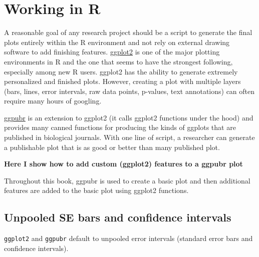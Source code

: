 \documentclass[]{book}
\begin{document}
\hypertarget{working-in-r}{%
\section{Working in R}\label{working-in-r}}

A reasonable goal of any research project should be a script to generate the final plots entirely within the R environment and not rely on external drawing software to add finishing features. \href{https://ggplot2.tidyverse.org}{ggplot2} is one of the major plotting environments in R and the one that seems to have the strongest following, especially among new R users. ggplot2 has the ability to generate extremely personalized and finished plots. However, creating a plot with multiple layers (bars, lines, error intervals, raw data points, p-values, text annotations) can often require many hours of googling.

\href{https://cran.r-project.org/web/packages/ggpubr/index.html}{ggpubr} is an extension to ggplot2 (it calls ggplot2 functions under the hood) and provides many canned functions for producing the kinds of ggplots that are published in biological journals. With one line of script, a researcher can generate a publishable plot that is as good or better than many published plot.

\textbf{Here I show how to add custom (ggplot2) features to a ggpubr plot}

Throughout this book, ggpubr is used to create a basic plot and then additional features are added to the basic plot using ggplot2 functions.

\hypertarget{unpooled-se-bars-and-confidence-intervals}{%
\subsection{Unpooled SE bars and confidence intervals}\label{unpooled-se-bars-and-confidence-intervals}}

\texttt{ggplot2} and \texttt{ggpubr} default to unpooled error intervals (standard error bars and confidence intervals).
\end{document}

